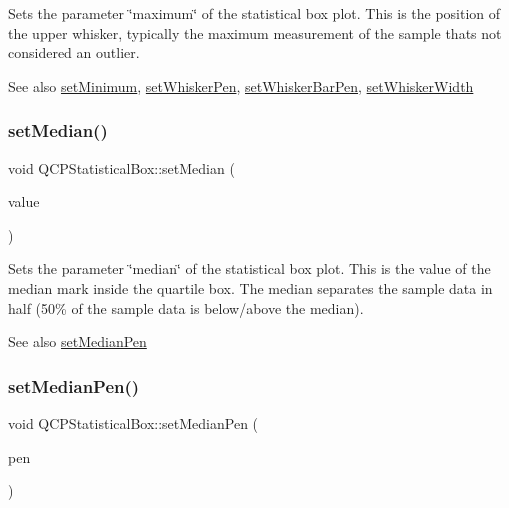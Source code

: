 Sets the parameter \char`\"{}maximum\char`\"{} of the statistical box plot. This is the position of the upper whisker, typically the maximum measurement of the sample that\textquotesingle{}s not considered an outlier.

\begin{DoxySeeAlso}{See also}
\hyperlink{class_q_c_p_statistical_box_a84ff7cc61ba44890f0c3e0c99c19941e}{set\+Minimum}, \hyperlink{class_q_c_p_statistical_box_a4a5034cb3b9b040444df05ab1684620b}{set\+Whisker\+Pen}, \hyperlink{class_q_c_p_statistical_box_aa8d3e503897788e1abf68dc74b5f147f}{set\+Whisker\+Bar\+Pen}, \hyperlink{class_q_c_p_statistical_box_adf378812446bd66f34d1f7f293d991cd}{set\+Whisker\+Width} 
\end{DoxySeeAlso}
\hypertarget{class_q_c_p_statistical_box_a65970e77a897da4ecb4b15300868aad3}{}\label{class_q_c_p_statistical_box_a65970e77a897da4ecb4b15300868aad3} 
\subsubsection{\texorpdfstring{set\+Median()}{setMedian()}}
{\footnotesize\ttfamily void Q\+C\+P\+Statistical\+Box\+::set\+Median (\begin{DoxyParamCaption}\item[{double}]{value }\end{DoxyParamCaption})}

Sets the parameter \char`\"{}median\char`\"{} of the statistical box plot. This is the value of the median mark inside the quartile box. The median separates the sample data in half (50\% of the sample data is below/above the median).

\begin{DoxySeeAlso}{See also}
\hyperlink{class_q_c_p_statistical_box_a7260ac55b669f5d0a74f16d5ca84c52c}{set\+Median\+Pen} 
\end{DoxySeeAlso}
\hypertarget{class_q_c_p_statistical_box_a7260ac55b669f5d0a74f16d5ca84c52c}{}\label{class_q_c_p_statistical_box_a7260ac55b669f5d0a74f16d5ca84c52c} 
\subsubsection{\texorpdfstring{set\+Median\+Pen()}{setMedianPen()}}
{\footnotesize\ttfamily void Q\+C\+P\+Statistical\+Box\+::set\+Median\+Pen (\begin{DoxyParamCaption}\item[{const Q\+Pen \&}]{pen }\end{DoxyParamCaption})}

